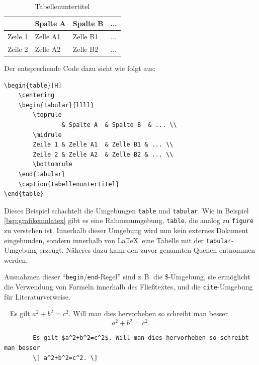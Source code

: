 \begin{beispiel}~
    \begin{table}[H]
        \centering
        \begin{tabular}{llll}
            \toprule
                    & Spalte A  & Spalte B  & ... \\
            \midrule
            Zeile 1 & Zelle A1  & Zelle B1 & ... \\
            Zeile 2 & Zelle A2  & Zelle B2 & ... \\
            \bottomrule
        \end{tabular}
        \caption{Tabellenuntertitel}
    \end{table}
    Der entsprechende Code dazu sieht wie folgt aus:
    \begin{lstlisting}
\begin{table}[H]
    \centering
    \begin{tabular}{llll}
        \toprule
                & Spalte A  & Spalte B  & ... \\
        \midrule
        Zeile 1 & Zelle A1  & Zelle B1 & ... \\
        Zeile 2 & Zelle A2  & Zelle B2 & ... \\
        \bottomrule
    \end{tabular}
    \caption{Tabellenuntertitel}
\end{table}
    \end{lstlisting}
    Dieses Beispiel schachtelt die Umgebungen \texttt{table} und \texttt{tabular}. Wie in Beispiel \ref{bsp:grafikeninlatex} gibt es eine Rahmenumgebung, \texttt{table}, die analog zu \texttt{figure} zu verstehen ist. Innerhalb dieser Umgebung wird nun kein externes Dokument eingebunden, sondern innerhalb von \LaTeX~eine Tabelle mit der \texttt{tabular}-Umgebung erzeugt. Näheres dazu kann den zuvor genannten Quellen entnommen werden.
\end{beispiel}

Ausnahmen dieser "`\lstinline|begin|/\lstinline|end|-Regel"' sind z.\,B. die \$-Umgebung, sie ermöglicht die Verwendung von Formeln innerhalb des Fließtextes, und die \texttt{cite}-Umgebung für Literaturverweise.

\begin{beispiel}[Formeln]~
    Es gilt $a^2+b^2=c^2$. Will man dies hervorheben so schreibt man besser
    \[ a^2+b^2=c^2. \] \newpage
    \begin{lstlisting}
        Es gilt $a^2+b^2=c^2$. Will man dies hervorheben so schreibt man besser
        \[ a^2+b^2=c^2. \]
    \end{lstlisting}
\end{beispiel}

